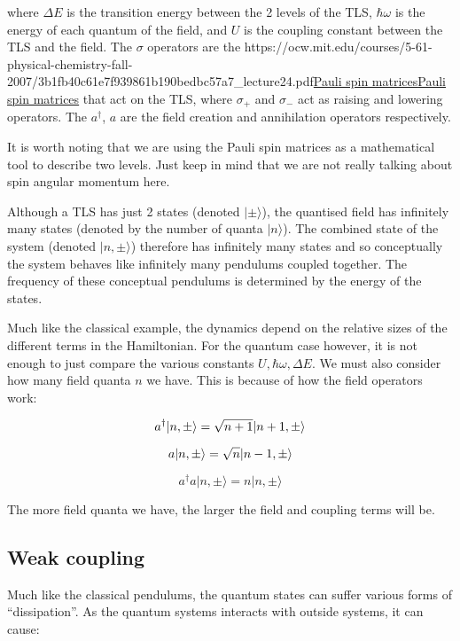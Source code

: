 \documentclass[
]{article}
\let\oldhref\href
\renewcommand{\href}[2]{\ifx#1\urlprefix\oldhref{#1}{#2}\else\uline{\oldhref{#1}{#2}}\fi}
\renewcommand{\[}{\begin{equation}}
\renewcommand{\]}{\end{equation}}
\begin{document}
where \(\Delta E\) is the transition energy between the 2 levels of the
TLS, \(\hbar\omega\) is the energy of each quantum of the field, and
\(U\) is the coupling constant between the TLS and the field. The
\(\sigma\) operators are the
\href{https://ocw.mit.edu/courses/5-61-physical-chemistry-fall-2007/3b1fb40c61e7f939861b190bedbc57a7_lecture24.pdf}{Pauli
spin matrices} that act on the TLS, where \(\sigma_+\) and \(\sigma_-\)
act as raising and lowering operators. The \(a^{\dagger}\), \(a\) are
the field creation and annihilation operators respectively.

It is worth noting that we are using the Pauli spin matrices as a
mathematical tool to describe two levels. Just keep in mind that we are
not really talking about spin angular momentum here.

Although a TLS has just 2 states (denoted \(|\pm\rangle\)), the
quantised field has infinitely many states (denoted by the number of
quanta \(|n\rangle\)). The combined state of the system (denoted
\(|n, \pm\rangle\)) therefore has infinitely many states and so
conceptually the system behaves like infinitely many pendulums coupled
together. The frequency of these conceptual pendulums is determined by
the energy of the states.

Much like the classical example, the dynamics depend on the relative
sizes of the different terms in the Hamiltonian. For the quantum case
however, it is not enough to just compare the various constants
\(U, \hbar \omega, \Delta E\). We must also consider how many field
quanta \(n\) we have. This is because of how the field operators work:

\[
a^{\dagger} |n,\pm\rangle = \sqrt{n+1}|n+1,\pm\rangle \\
\]

\[
a |n,\pm\rangle = \sqrt{n}|n-1,\pm\rangle \\
\]

\[
a^{\dagger}a |n,\pm\rangle = n|n,\pm\rangle
\]

The more field quanta we have, the larger the field and coupling terms
will be.

\subsection{Weak coupling}\label{weak-coupling-1}

Much like the classical pendulums, the quantum states can suffer various
forms of ``dissipation''. As the quantum systems interacts with outside
systems, it can cause:
\end{document}
